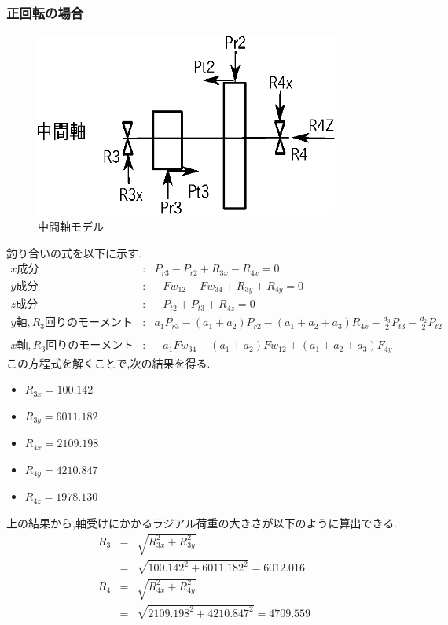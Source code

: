 \documentclass[a4j,twoside,openright,11pt]{jreport}
\begin{document}
\subsubsection{正回転の場合}
\begin{figure}[htbp]
\begin{center}
\includegraphics[width=10cm]{jiku4.eps}
\end{center}
\caption{中間軸モデル}
\end{figure}
釣り合いの式を以下に示す.
\begin{eqnarray}
x成分&:&P_{r3}-P_{r2}+R_{3x}-R_{4x}=0\\
y成分&:&-Fw_{12}-Fw_{34}+R_{3y}+R_{4y}=0\\
z成分&:&-P_{t2}+P_{t3}+R_{4z}=0\\
y軸,R_3回りのモーメント&:&a_1P_{r3}-(a_1+a_2)P_{r2}-(a_1+a_2+a_3)R_{4x}-\frac{d_3}{2}P_{t3}-\frac{d_2}{2}P_{t2}\nonumber\\
\\
x軸,R_3回りのモーメント&:&-a_1Fw_{34}-(a_1+a_2)Fw_{12}+(a_1+a_2+a_3)F_{4y}
\end{eqnarray}
この方程式を解くことで,次の結果を得る.
\begin{itemize}
\item $R_{3x} = 100.142$
\item $R_{3y} = 6011.182$
\item $R_{4x} = 2109.198$
\item $R_{4y} = 4210.847$
\item $R_{4z} = 1978.130$
\end{itemize}
上の結果から,軸受けにかかるラジアル荷重の大きさが以下のように算出できる.
\begin{eqnarray}
R_3 &=& \sqrt {R_{3x}^2+R_{3y}^2}\\
    &=& \sqrt {100.142^2+6011.182^2}=6012.016\\
R_4 &=& \sqrt {R_{4x}^2+R_{4y}^2}\\
    &=& \sqrt {2109.198^2+4210.847^2}=4709.559
\end{eqnarray}
\end{document}
